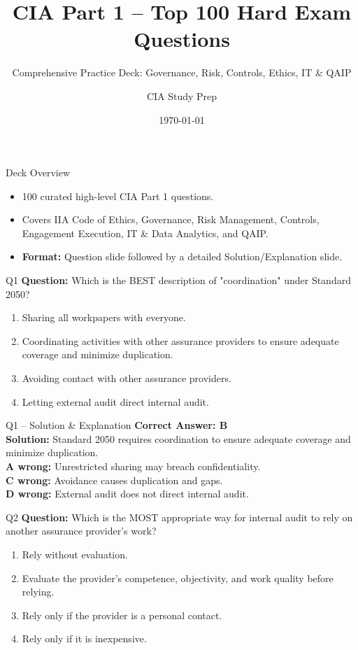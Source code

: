\documentclass[aspectratio=169,10pt]{beamer}
\title{CIA Part 1 -- Top 100 Hard Exam Questions}
\subtitle{Comprehensive Practice Deck: Governance, Risk, Controls, Ethics, IT \& QAIP}
\author{CIA Study Prep}
\date{\today}
\begin{document}
	
	\begin{frame}
		\titlepage
	\end{frame}
	
	\begin{frame}{Deck Overview}
		\begin{itemize}
			\item 100 curated high-level CIA Part 1 questions.
			\item Covers IIA Code of Ethics, Governance, Risk Management, Controls, Engagement Execution, IT \& Data Analytics, and QAIP.
			\item \textbf{Format:} Question slide followed by a detailed Solution/Explanation slide.
		\end{itemize}
	\end{frame}
	
	\begin{frame}[t]{Q1}
		\small
		\textbf{Question:} Which is the BEST description of "coordination" under Standard 2050?
		\begin{enumerate}[label=\Alph*.,itemsep=1pt,topsep=2pt]
			\item Sharing all workpapers with everyone.
			\item Coordinating activities with other assurance providers to ensure adequate coverage and minimize duplication.
			\item Avoiding contact with other assurance providers.
			\item Letting external audit direct internal audit.
		\end{enumerate}
	\end{frame}
	
	\begin{frame}[t]{Q1 -- Solution \& Explanation}
		\small
		\textbf{Correct Answer: B} \\[4pt]
		\textbf{Solution:} Standard 2050 requires coordination to ensure adequate coverage and minimize duplication. \\[4pt]
		\textbf{A wrong:} Unrestricted sharing may breach confidentiality. \\[2pt]
		\textbf{C wrong:} Avoidance causes duplication and gaps. \\[2pt]
		\textbf{D wrong:} External audit does not direct internal audit.
	\end{frame}
	
	\begin{frame}[t]{Q2}
		\small
		\textbf{Question:} Which is the MOST appropriate way for internal audit to rely on another assurance provider's work?
		\begin{enumerate}[label=\Alph*.,itemsep=1pt,topsep=2pt]
			\item Rely without evaluation.
			\item Evaluate the provider's competence, objectivity, and work quality before relying.
			\item Rely only if the provider is a personal contact.
			\item Rely only if it is inexpensive.
		\end{enumerate}
	\end{frame}
	
\end{document}
